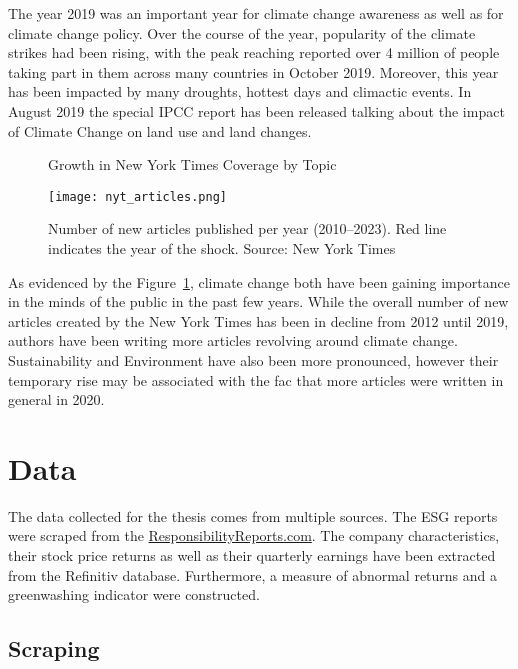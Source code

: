 \documentclass[12pt]{article}
\begin{document}
The year 2019 was an important year for climate change awareness as well as for climate change policy. Over the course of the year, popularity of the climate strikes had been rising, with the peak reaching reported over 4 million of people taking part in them across many countries in October 2019. Moreover, this year has been impacted by many droughts, hottest days and climactic events. In August 2019 the special IPCC report has been released talking about the impact of Climate Change on land use and land changes. 



\begin{figure}[!h]
    \caption{Growth in New York Times Coverage by Topic}\label{fig:news_trends}
    \texttt{[image: nyt\_articles.png]}
    \captionsetup{font=footnotesize}
    \caption*{Number of new articles published per year (2010--2023). Red line indicates the year of the shock. Source: New York Times}
\end{figure}

As evidenced by the Figure~\ref{fig:news_trends}, climate change both have been gaining importance in the minds of the public in the past few years. While the overall number of new articles created by the New York Times has been in decline from 2012 until 2019, authors have been writing more articles revolving around climate change. Sustainability and Environment have also been more pronounced, however their temporary rise may be associated with the fac that more articles were written in general in 2020. 




\newpage

\section{Data}\label{sect:data}

The data collected for the thesis comes from multiple sources. The ESG reports were scraped from the \href{https://responsibilityreports.com}{ResponsibilityReports.com}. The company characteristics, their stock price returns as well as their quarterly earnings have been extracted from the Refinitiv database. Furthermore, a measure of abnormal returns and a greenwashing indicator were constructed.


\subsection{Scraping}
\end{document}
